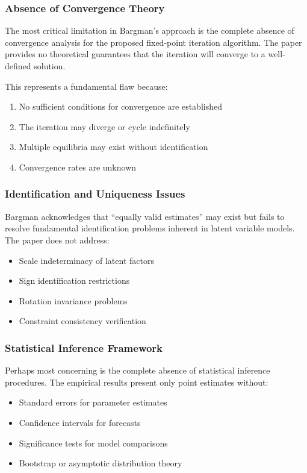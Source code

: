 \documentclass[12pt,letterpaper]{article}
\begin{document}
\subsubsection{Absence of Convergence Theory}

The most critical limitation in Bargman's approach is the complete absence of convergence analysis for the proposed fixed-point iteration algorithm. The paper provides no theoretical guarantees that the iteration will converge to a well-defined solution.

This represents a fundamental flaw because:
\begin{enumerate}
\item No sufficient conditions for convergence are established
\item The iteration may diverge or cycle indefinitely
\item Multiple equilibria may exist without identification
\item Convergence rates are unknown
\end{enumerate}

\subsubsection{Identification and Uniqueness Issues}

Bargman acknowledges that ``equally valid estimates'' may exist but fails to resolve fundamental identification problems inherent in latent variable models. The paper does not address:

\begin{itemize}
\item Scale indeterminacy of latent factors
\item Sign identification restrictions
\item Rotation invariance problems
\item Constraint consistency verification
\end{itemize}

\subsubsection{Statistical Inference Framework}

Perhaps most concerning is the complete absence of statistical inference procedures. The empirical results present only point estimates without:

\begin{itemize}
\item Standard errors for parameter estimates
\item Confidence intervals for forecasts
\item Significance tests for model comparisons
\item Bootstrap or asymptotic distribution theory
\end{itemize}
\end{document}
